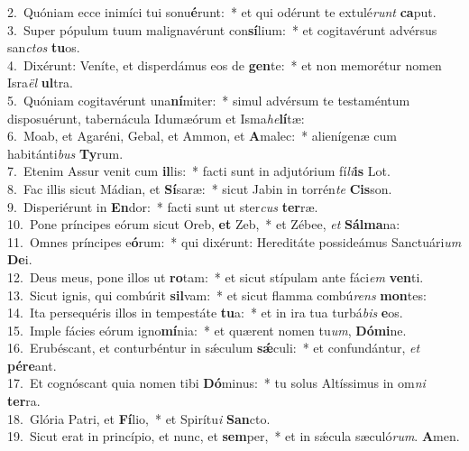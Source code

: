 {2.~}Quóniam ecce inimíci tui sonu\textbf{é}runt:~* et qui odérunt te extulé\textit{runt} \textbf{ca}put.\\
{3.~}Super pópulum tuum malignavérunt con\textbf{sí}lium:~* et cogitavérunt advérsus san\textit{ctos} \textbf{tu}os.\\
{4.~}Dixérunt: Veníte, et disperdámus eos de \textbf{gen}te:~* et non memorétur nomen Isra\textit{ël} \textbf{ul}tra.\\
{5.~}Quóniam cogitavérunt una\textbf{ní}miter:~* simul advérsum te testaméntum disposuérunt, tabernácula Idumæórum et Isma\textit{he}\textbf{lí}tæ:\\
{6.~}Moab, et Agaréni, Gebal, et Ammon, et \textbf{A}malec:~* alienígenæ cum habitánti\textit{bus} \textbf{Ty}rum.\\
{7.~}Etenim Assur venit cum \textbf{il}lis:~* facti sunt in adjutórium fí\textit{li}\textbf{is} Lot.\\
{8.~}Fac illis sicut Mádian, et \textbf{Sí}saræ:~* sicut Jabin in torrén\textit{te} \textbf{Cis}son.\\
{9.~}Disperiérunt in \textbf{En}dor:~* facti sunt ut ster\textit{cus} \textbf{ter}ræ.\\
{10.~}Pone príncipes eórum sicut Oreb, \textbf{et} Zeb,~* et Zébee, \textit{et} \textbf{Sál}\textbf{ma}na:\\
{11.~}Omnes príncipes e\textbf{ó}rum:~* qui dixérunt: Hereditáte possideámus Sanctuári\textit{um} \textbf{De}i.\\
{12.~}Deus meus, pone illos ut \textbf{ro}tam:~* et sicut stípulam ante fáci\textit{em} \textbf{ven}ti.\\
{13.~}Sicut ignis, qui combúrit \textbf{sil}vam:~* et sicut flamma combú\textit{rens} \textbf{mon}tes:\\
{14.~}Ita persequéris illos in tempestáte \textbf{tu}a:~* et in ira tua turbá\textit{bis} \textbf{e}os.\\
{15.~}Imple fácies eórum igno\textbf{mí}nia:~* et quærent nomen tu\textit{um}, \textbf{Dó}\textbf{mi}ne.\\
{16.~}Erubéscant, et conturbéntur in sǽculum \textbf{sǽ}culi:~* et confundántur, \textit{et} \textbf{pé}\textbf{re}ant.\\
{17.~}Et cognóscant quia nomen tibi \textbf{Dó}minus:~* tu solus Altíssimus in om\textit{ni} \textbf{ter}ra.\\
{18.~}Glória Patri, et \textbf{Fí}lio,~* et Spirítu\textit{i} \textbf{San}cto.\\
{19.~}Sicut erat in princípio, et nunc, et \textbf{sem}per,~* et in sǽcula sæculó\textit{rum}. \textbf{A}men.\\
